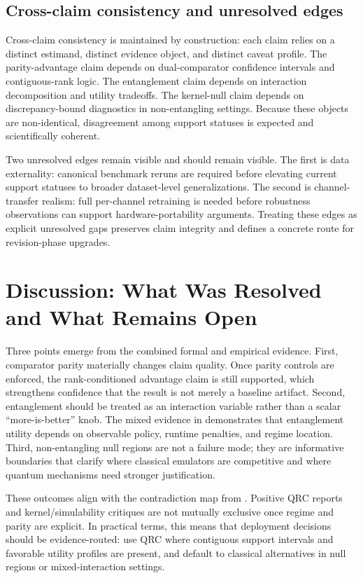 \subsection{Cross-claim consistency and unresolved edges}
Cross-claim consistency is maintained by construction: each claim relies on a distinct estimand, distinct evidence object, and distinct caveat profile. The parity-advantage claim depends on dual-comparator confidence intervals and contiguous-rank logic. The entanglement claim depends on interaction decomposition and utility tradeoffs. The kernel-null claim depends on discrepancy-bound diagnostics in non-entangling settings. Because these objects are non-identical, disagreement among support statuses is expected and scientifically coherent.

Two unresolved edges remain visible and should remain visible. The first is data externality: canonical benchmark reruns are required before elevating current support statuses to broader dataset-level generalizations. The second is channel-transfer realism: full per-channel retraining is needed before robustness observations can support hardware-portability arguments. Treating these edges as explicit unresolved gaps preserves claim integrity and defines a concrete route for revision-phase upgrades.

\section{Discussion: What Was Resolved and What Remains Open}\label{sec:discussion}
Three points emerge from the combined formal and empirical evidence. First, comparator parity materially changes claim quality. Once parity controls are enforced, the rank-conditioned advantage claim is still supported, which strengthens confidence that the result is not merely a baseline artifact. Second, entanglement should be treated as an interaction variable rather than a scalar ``more-is-better'' knob. The mixed evidence in  demonstrates that entanglement utility depends on observable policy, runtime penalties, and regime location. Third, non-entangling null regions are not a failure mode; they are informative boundaries that clarify where classical emulators are competitive and where quantum mechanisms need stronger justification.

These outcomes align with the contradiction map from . Positive QRC reports and kernel/simulability critiques are not mutually exclusive once regime and parity are explicit. In practical terms, this means that deployment decisions should be evidence-routed: use QRC where contiguous support intervals and favorable utility profiles are present, and default to classical alternatives in null regions or mixed-interaction settings.

